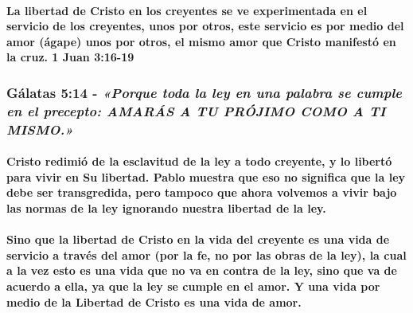 \documentclass[11a pt,twoside]{article}
\newcommand{\scripture}[1]{%
  {\fontsize{12pt}{16pt}\selectfont\ScriptureFont\itshape #1}%
}
\let\oldsubsubsection\subsubsection
\renewcommand{\subsubsection}{\needspace{4\baselineskip}\oldsubsubsection}
\let\oldparagraph\paragraph
\renewcommand{\paragraph}{\needspace{3\baselineskip}\oldparagraph}
\begin{document}
\paragraph{La libertad de Cristo en los creyentes se ve experimentada en
el servicio de los creyentes, unos por otros, este servicio es por medio
del amor (ágape) unos por otros, el mismo amor que Cristo manifestó en
la cruz. 1 Juan
3:16-19}\label{la-libertad-de-cristo-en-los-creyentes-se-ve-experimentada-en-el-servicio-de-los-creyentes-unos-por-otros-este-servicio-es-por-medio-del-amor-uxe1gape-unos-por-otros-el-mismo-amor-que-cristo-manifestuxf3-en-la-cruz.-1-juan-316-19}

\subsubsection{\texorpdfstring{Gálatas 5:14 -
\scripture{«Porque toda la ley en una palabra se cumple en el precepto: AMARÁS A TU PRÓJIMO COMO A TI MISMO.»}}{Gálatas 5:14 - }}\label{guxe1latas-514---porque-toda-la-ley-en-una-palabra-se-cumple-en-el-precepto-amaruxe1s-a-tu-pruxf3jimo-como-a-ti-mismo.}

\paragraph{Cristo redimió de la esclavitud de la ley a todo creyente, y
lo libertó para vivir en Su libertad. Pablo muestra que eso no significa
que la ley debe ser transgredida, pero tampoco que ahora volvemos a
vivir bajo las normas de la ley ignorando nuestra libertad de la
ley.}\label{cristo-redimiuxf3-de-la-esclavitud-de-la-ley-a-todo-creyente-y-lo-libertuxf3-para-vivir-en-su-libertad.-pablo-muestra-que-eso-no-significa-que-la-ley-debe-ser-transgredida-pero-tampoco-que-ahora-volvemos-a-vivir-bajo-las-normas-de-la-ley-ignorando-nuestra-libertad-de-la-ley.}

\paragraph{Sino que la libertad de Cristo en la vida del creyente es una
vida de servicio a través del amor (por la fe, no por las obras de la
ley), la cual a la vez esto es una vida que no va en contra de la ley,
sino que va de acuerdo a ella, ya que la ley se cumple en el amor. Y una
vida por medio de la Libertad de Cristo es una vida de
amor.}\label{sino-que-la-libertad-de-cristo-en-la-vida-del-creyente-es-una-vida-de-servicio-a-travuxe9s-del-amor-por-la-fe-no-por-las-obras-de-la-ley-la-cual-a-la-vez-esto-es-una-vida-que-no-va-en-contra-de-la-ley-sino-que-va-de-acuerdo-a-ella-ya-que-la-ley-se-cumple-en-el-amor.-y-una-vida-por-medio-de-la-libertad-de-cristo-es-una-vida-de-amor.}
\end{document}
